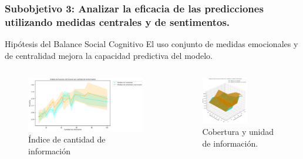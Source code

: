\documentclass{beamer}
\begin{document}
\begin{frame}
	\frametitle{Subobjetivo 3: Analizar la eficacia de las predicciones utilizando medidas centrales y de sentimentos.}
\begin{block}{Hipótesis del Balance Social Cognitivo}
	El uso conjunto de medidas emocionales y de centralidad mejora la capacidad predictiva del modelo.
\end{block}
	
	
	\begin{columns}[c]
		\begin{column}{.5\textwidth}
			\begin{figure}
				\centering
				\includegraphics[width=1\textwidth]{figs/cap7/figura_55}
\caption{Índice de cantidad de información}
			\end{figure}      
		\end{column}
		\begin{column}{.5\textwidth}
			\begin{figure}
				\centering
				\includegraphics[width=0.60\textwidth]{figs/cap7/figura_56}
			\caption{Cobertura y unidad de información.}
			\end{figure}
		\end{column}
	\end{columns}
	
	
	
\end{frame}
\end{document}
